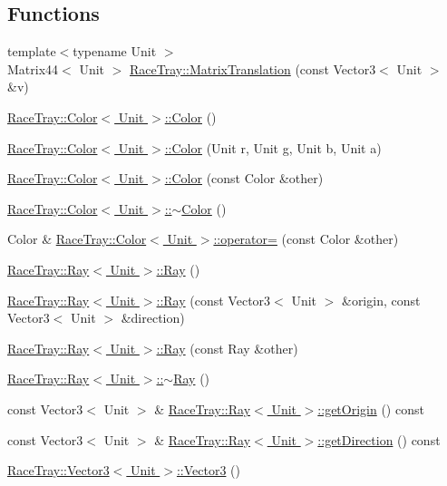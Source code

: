 \subsection*{Functions}
\begin{DoxyCompactItemize}
\item 
{\footnotesize template$<$typename Unit $>$ }\\Matrix44$<$ Unit $>$ \hyperlink{group___math_ga2f3aac0fbdfd537a9286647da4ab7e6b}{Race\-Tray\-::\-Matrix\-Translation} (const Vector3$<$ Unit $>$ \&v)
\item 
\hyperlink{group___math_ga9a742cbe9f9f4037f5d9f4e81a9b2428}{Race\-Tray\-::\-Color$<$ Unit $>$\-::\-Color} ()
\item 
\hyperlink{group___math_gad9c19651c0feb39d14efb0bf957c9cf9}{Race\-Tray\-::\-Color$<$ Unit $>$\-::\-Color} (Unit r, Unit g, Unit b, Unit a)
\item 
\hyperlink{group___math_ga866f5b3f4192cdd953900b3bdae4b2cd}{Race\-Tray\-::\-Color$<$ Unit $>$\-::\-Color} (const Color \&other)
\item 
\hyperlink{group___math_ga3cfce6c6821d3bf489e26074c55378c0}{Race\-Tray\-::\-Color$<$ Unit $>$\-::$\sim$\-Color} ()
\item 
Color \& \hyperlink{group___math_ga495cb1736fef1e5306e572365203ff42}{Race\-Tray\-::\-Color$<$ Unit $>$\-::operator=} (const Color \&other)
\item 
\hyperlink{group___math_ga2e3d2c29f2df4ab3da10da79d4acb852}{Race\-Tray\-::\-Ray$<$ Unit $>$\-::\-Ray} ()
\item 
\hyperlink{group___math_gabe89aef5906b96af94ad94ad0deba455}{Race\-Tray\-::\-Ray$<$ Unit $>$\-::\-Ray} (const Vector3$<$ Unit $>$ \&origin, const Vector3$<$ Unit $>$ \&direction)
\item 
\hyperlink{group___math_ga8e46b1356e03d968ffd813076d6818b2}{Race\-Tray\-::\-Ray$<$ Unit $>$\-::\-Ray} (const Ray \&other)
\item 
\hyperlink{group___math_ga8b0e575ce5df046c0c7615c32a96a46f}{Race\-Tray\-::\-Ray$<$ Unit $>$\-::$\sim$\-Ray} ()
\item 
const Vector3$<$ Unit $>$ \& \hyperlink{group___math_gab1690c909fff67ff5c878aa6f05bfe2b}{Race\-Tray\-::\-Ray$<$ Unit $>$\-::get\-Origin} () const 
\item 
const Vector3$<$ Unit $>$ \& \hyperlink{group___math_gaab0b0ed57af0899286c2996dfdc9418b}{Race\-Tray\-::\-Ray$<$ Unit $>$\-::get\-Direction} () const 
\item 
\hyperlink{group___math_ga0f49191f7e001e7f7ae1cb49522118b4}{Race\-Tray\-::\-Vector3$<$ Unit $>$\-::\-Vector3} ()

\end{DoxyCompactItemize}
